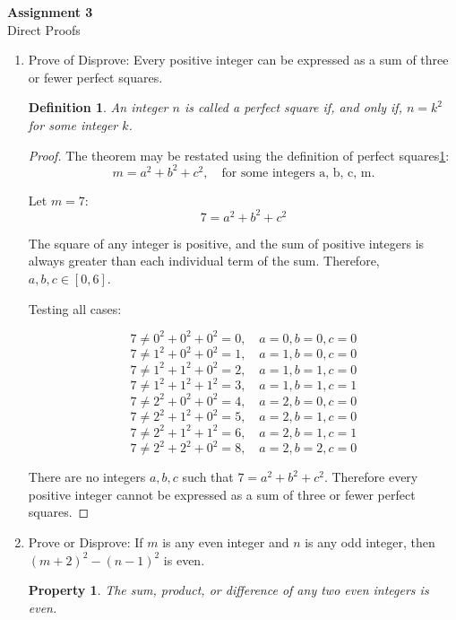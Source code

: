 \documentclass[11pt, letterpaper, includehead]{article}
\theoremstyle{plain}
\theoremstyle{mydefinition}
\newtheorem{defin}{Definition}
\theoremstyle{myproperty}
\newtheorem{prop}{Property}
\begin{document}
 

\pagestyle{fancy}
\fancyhead{}
\fancyfoot{}


\begin{center}
    \Large{\textbf{Assignment 3}}\\
    \Large{Direct Proofs}
\end{center}

\begin{enumerate}[label=\textbf{\arabic*}., leftmargin=*]
\item Prove of Disprove: Every positive integer can be expressed as a sum of three or fewer
    perfect squares.
\begin{defin}\label{def:def1a}
    An integer $n$ is called a perfect square if, and only if, $n = k^2$ for some integer $k$.
\end{defin}
\begin{proof}
    The theorem may be restated using the definition of perfect squares\ref{def:def1a}:
    \[m = a^2 + b^2 + c^2, \quad \text{for some integers a, b, c, m.}\]

    Let $m = 7$:
    \[7 = a^2 + b^2 + c^2\]

    The square of any integer is positive, and the sum of positive integers is always greater than each individual term of the sum. Therefore, $a, b, c \in [0, 6]$.

    Testing all cases:

    \[7 \neq 0^2 + 0^2 + 0^2 = 0, \quad a = 0, b = 0, c = 0\]
    \[7 \neq 1^2 + 0^2 + 0^2 = 1, \quad a = 1, b = 0, c = 0\]
    \[7 \neq 1^2 + 1^2 + 0^2 = 2, \quad a = 1, b = 1, c = 0\]
    \[7 \neq 1^2 + 1^2 + 1^2 = 3, \quad a = 1, b = 1, c = 1\]
    \[7 \neq 2^2 + 0^2 + 0^2 = 4, \quad a = 2, b = 0, c = 0\]
    \[7 \neq 2^2 + 1^2 + 0^2 = 5, \quad a = 2, b = 1, c = 0\]
    \[7 \neq 2^2 + 1^2 + 1^2 = 6, \quad a = 2, b = 1, c = 1\]
    \[7 \neq 2^2 + 2^2 + 0^2 = 8, \quad a = 2, b = 2, c = 0\]

    There are no integers $a, b, c$ such that $7 = a^2 + b^2 + c^2$. Therefore every positive integer cannot be expressed as a sum of three or fewer
    perfect squares.

\end{proof}

\pagebreak 

\item Prove or Disprove: If $m$ is any even integer and $n$ is any odd integer,
then $(m + 2)^2 - (n - 1)^2$ is even.
\begin{prop}\label{prop:prop2a}
    The sum, product, or difference of any two even integers is even.
\end{prop}


\end{enumerate}
\end{document}
